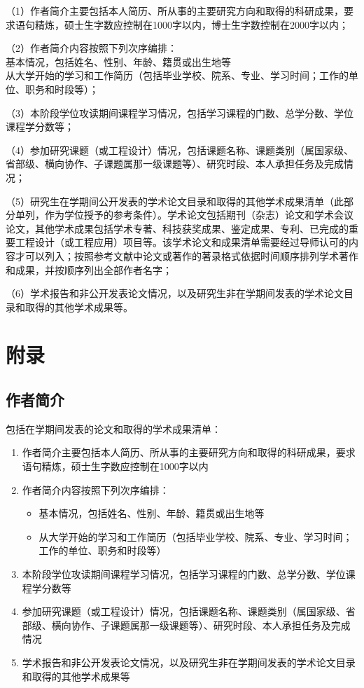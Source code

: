 \documentclass{nuistthesis}
\begin{document}
（1）作者简介主要包括本人简历、所从事的主要研究方向和取得的科研成果，要求语句精炼，硕士生字数应控制在1000字以内，博士生字数控制在2000字以内；

（2）作者简介内容按照下列次序编排： \\
基本情况，包括姓名、性别、年龄、籍贯或出生地等 \\
从大学开始的学习和工作简历（包括毕业学校、院系、专业、学习时间；工作的单位、职务和时段等）；

（3）本阶段学位攻读期间课程学习情况，包括学习课程的门数、总学分数、学位课程学分数等；

（4）参加研究课题（或工程设计）情况，包括课题名称、课题类别（属国家级、省部级、横向协作、子课题属那一级课题等）、研究时段、本人承担任务及完成情况； 

（5）研究生在学期间公开发表的学术论文目录和取得的其他学术成果清单（此部分单列，作为学位授予的参考条件）。学术论文包括期刊（杂志）论文和学术会议论文，其他学术成果包括学术专著、科技获奖成果、鉴定成果、专利、已完成的重要工程设计（或工程应用）项目等。该学术论文和成果清单需要经过导师认可的内容才可以列入；按照参考文献中论文或著作的著录格式依据时间顺序排列学术著作和成果，并按顺序列出全部作者名字；

（6）学术报告和非公开发表论文情况，以及研究生非在学期间发表的学术论文目录和取得的其他学术成果等。

\section{附录}

\subsection{作者简介}

包括在学期间发表的论文和取得的学术成果清单：

\renewcommand\labelenumi{（\theenumi）}
\begin{enumerate}
    \item 作者简介主要包括本人简历、所从事的主要研究方向和取得的科研成果，要求语句精炼，硕士生字数应控制在1000字以内
    \item 作者简介内容按照下列次序编排：
    \begin{itemize}
        \item 基本情况，包括姓名、性别、年龄、籍贯或出生地等
        \item 从大学开始的学习和工作简历（包括毕业学校、院系、专业、学习时间；工作的单位、职务和时段等）
    \end{itemize}
   \item 本阶段学位攻读期间课程学习情况，包括学习课程的门数、总学分数、学位课程学分数等
   \item 参加研究课题（或工程设计）情况，包括课题名称、课题类别（属国家级、省部级、横向协作、子课题属那一级课题等）、研究时段、本人承担任务及完成情况
   \item 学术报告和非公开发表论文情况，以及研究生非在学期间发表的学术论文目录和取得的其他学术成果等
\end{enumerate}
\end{document}
